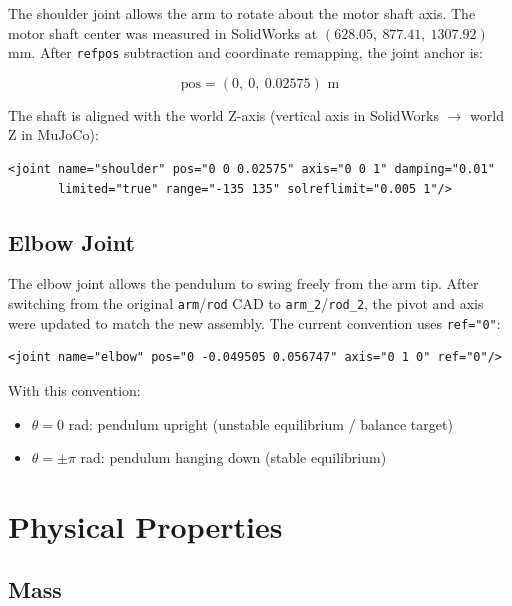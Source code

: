 \documentclass[12pt,a4paper]{article}
\begin{document}
The shoulder joint allows the arm to rotate about the motor shaft axis.
The motor shaft center was measured in SolidWorks at $(628.05,\ 877.41,\ 1307.92)$ mm.
After \texttt{refpos} subtraction and coordinate remapping, the joint anchor is:

\begin{equation}
\text{pos} = (0,\ 0,\ 0.02575) \text{ m}
\end{equation}

\noindent The shaft is aligned with the world Z-axis (vertical axis in SolidWorks $\rightarrow$ world Z in MuJoCo):

\begin{lstlisting}[style=xml]
<joint name="shoulder" pos="0 0 0.02575" axis="0 0 1" damping="0.01"
       limited="true" range="-135 135" solreflimit="0.005 1"/>
\end{lstlisting}

\subsection{Elbow Joint}

The elbow joint allows the pendulum to swing freely from the arm tip.  After
switching from the original \texttt{arm}/\texttt{rod} CAD to
\texttt{arm\_2}/\texttt{rod\_2}, the pivot and axis were updated to match the
new assembly.  The current convention uses \texttt{ref="0"}:

\begin{lstlisting}[style=xml]
<joint name="elbow" pos="0 -0.049505 0.056747" axis="0 1 0" ref="0"/>
\end{lstlisting}

\noindent With this convention:
\begin{itemize}
    \item $\theta = 0$ rad: pendulum upright (unstable equilibrium / balance target)
    \item $\theta = \pm\pi$ rad: pendulum hanging down (stable equilibrium)
\end{itemize}

\section{Physical Properties}

\subsection{Mass}
\end{document}

